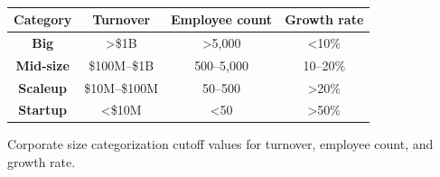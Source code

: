 \documentclass{article}
\begin{document}
\begin{table} %
    \vspace{-20pt} %
    \setlength{\tabcolsep}{3pt} %
    \centering
    \begin{tabular}{|c|c|c|c|}
        \hline
        \textbf{Category} & \textbf{Turnover}  & \textbf{Employee count} & \textbf{Growth rate} \\ \hline
        \textbf{Big}      & \textgreater{}\$1B & \textgreater{}5,000     & \textless{}10\%      \\ \hline
        \textbf{Mid-size} & \$100M–\$1B        & 500–5,000               & 10–20\%              \\ \hline
        \textbf{Scaleup}  & \$10M–\$100M       & 50–500                  & \textgreater{}20\%   \\ \hline
        \textbf{Startup}  & \textless{}\$10M   & \textless{}50           & \textgreater{}50\%   \\ \hline
    \end{tabular}
    
    \captionsetup{skip=2pt} %
    \caption{\hspace{1mm}Corporate size categorization cutoff values for turnover, employee count, and growth rate.}
    \vspace{-7pt} %
    \caption*{} %
    \label{tab:corporate_size}
    \vspace{-10pt} %
\end{table}
\end{document}
